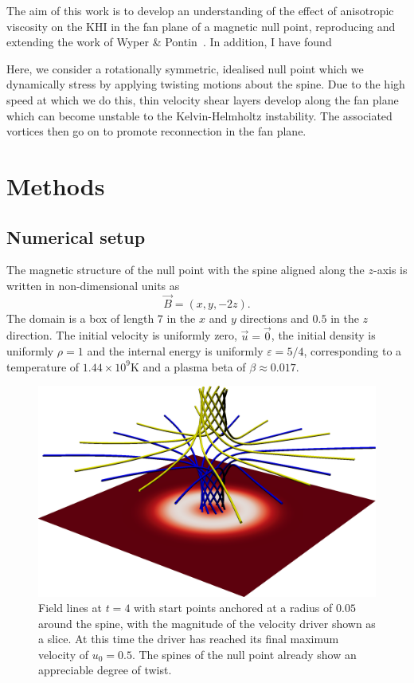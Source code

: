 The aim of this work is to develop an understanding of the effect of anisotropic viscosity on the KHI in the fan plane of a magnetic null point, reproducing and extending the work of Wyper \& Pontin~\cite{wyperKelvinHelmholtzInstabilityCurrentvortex2013}. In addition, I have found 

Here, we consider a rotationally symmetric, idealised null point which we dynamically stress by applying twisting motions about the spine. Due to the high speed at which we do this, thin velocity shear layers develop along the fan plane which can become unstable to the Kelvin-Helmholtz instability. The associated vortices then go on to promote reconnection in the fan plane. 

\section{Methods}

\subsection{Numerical setup}

The magnetic structure of the null point with the spine aligned along the $z$-axis is written in non-dimensional units as
\begin{equation}
  \label{eq:null_point_field}
  \vec{B} = (x, y, -2z).
\end{equation}
The domain is a box of length $7$ in the $x$ and $y$ directions and $0.5$ in the $z$ direction. The initial velocity is uniformly zero, $\vec{u} = \vec{0}$, the initial density is uniformly $\rho = 1$ and the internal energy is uniformly $\varepsilon = 5/4$, corresponding to a temperature of $1.44 \times 10^9$K and a plasma beta of $\beta \approx 0.017$.

\begin{figure}[t]
  \centering
      \includegraphics[width=\linewidth]{field_line_plots/cropped/v-4r-4-isotropic_0008_cropped.png}
  \caption{Field lines at $t=4$ with start points anchored at a radius of $0.05$ around the spine, with the magnitude of the velocity driver shown as a slice. At this time the driver has reached its final maximum velocity of $u_0 = 0.5$. The spines of the null point already show an appreciable degree of twist.}%
  \label{fig:field_line_plots/v-4r-4-iso-field-8}
\end{figure}

